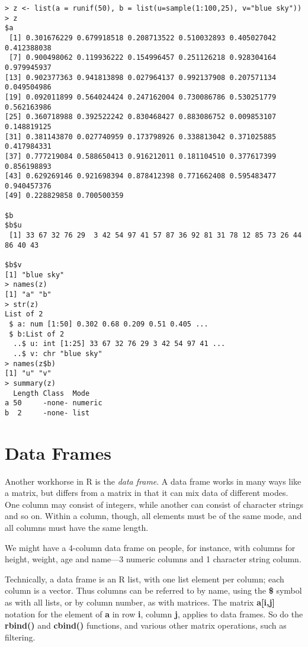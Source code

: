 \begin{lstlisting}
> z <- list(a = runif(50), b = list(u=sample(1:100,25), v="blue sky"))
> z
$a
 [1] 0.301676229 0.679918518 0.208713522 0.510032893 0.405027042
0.412388038
 [7] 0.900498062 0.119936222 0.154996457 0.251126218 0.928304164
0.979945937
[13] 0.902377363 0.941813898 0.027964137 0.992137908 0.207571134
0.049504986
[19] 0.092011899 0.564024424 0.247162004 0.730086786 0.530251779
0.562163986
[25] 0.360718988 0.392522242 0.830468427 0.883086752 0.009853107
0.148819125
[31] 0.381143870 0.027740959 0.173798926 0.338813042 0.371025885
0.417984331
[37] 0.777219084 0.588650413 0.916212011 0.181104510 0.377617399
0.856198893
[43] 0.629269146 0.921698394 0.878412398 0.771662408 0.595483477
0.940457376
[49] 0.228829858 0.700500359

$b
$b$u
 [1] 33 67 32 76 29  3 42 54 97 41 57 87 36 92 81 31 78 12 85 73 26 44
86 40 43

$b$v
[1] "blue sky"
> names(z)
[1] "a" "b"
> str(z)
List of 2
 $ a: num [1:50] 0.302 0.68 0.209 0.51 0.405 ...
 $ b:List of 2
  ..$ u: int [1:25] 33 67 32 76 29 3 42 54 97 41 ...
  ..$ v: chr "blue sky"
> names(z$b)
[1] "u" "v"
> summary(z)
  Length Class  Mode
a 50     -none- numeric
b  2     -none- list
\end{lstlisting}

\section{Data Frames}

Another workhorse in R is the {\it data frame}.  A data frame works in
many ways like a matrix, but differs from a matrix in that it can mix
data of different modes.  One column may consist of integers, while
another can consist of character strings and so on.  Within a column,
though, all elements must be of the same mode, and all columns must have
the same length.

We might have a 4-column data frame on people, for instance, with
columns for height, weight, age and name---3 numeric columns and 1
character string column.

Technically, a data frame is an R list, with one list element per
column; each column is a vector.  Thus columns can be referred to by
name, using the {\bf \$} symbol as with all lists, or by column number,
as with matrices.  The matrix {\bf a[i,j]} notation for the element of
{\bf a} in row {\bf i}, column {\bf j}, applies to data frames.  So do
the {\bf rbind()} and {\bf cbind()} functions, and various other matrix
operations, such as filtering.

